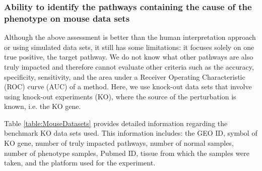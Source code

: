 
\subsubsection{Ability to identify the pathways containing the cause of the phenotype on mouse data sets}
\label{KOsubsubsection}

Although the above assessment is better than the human interpretation approach or using simulated data sets, it still has some limitations: it focuses solely on one true positive, the target pathway. We do not know what other pathways are also truly impacted and therefore cannot evaluate other criteria such as the accuracy, specificity, sensitivity, and the area under a Receiver Operating Characteristic (ROC) curve (AUC) of a method. Here, we use knock-out data sets that involve using knock-out experiments (KO), where the source of the perturbation is known, i.e. the KO gene.

 Table \ref{table:MouseDatasets} provides detailed information regarding the  benchmark KO data sets used. This information includes:  the GEO ID, symbol of KO gene, number of truly impacted pathways, number of normal samples, number of phenotype samples, Pubmed ID, tissue from which the samples were taken, and the platform used for the experiment.


